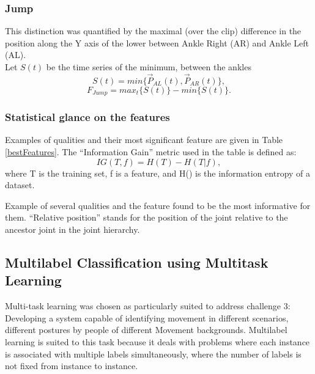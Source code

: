 \documentclass[11pt,twocolumn,varwidth=true,a4paper,fleqn]{sigchi}
\begin{document}
\subsubsection{Jump}
This distinction was quantified by the maximal (over the clip) difference in the position along the Y axis of the lower between Ankle Right (AR) and Ankle Left (AL). 
\\Let $S(t)$ be the time series of the minimum, between the ankles
\begin{equation*}
S(t) = min\{\vec{P}_{AL}(t), \vec{P}_{AR}(t)\},
\end{equation*}
\begin{equation*}
F_{Jump} = max_{t}\{S(t)\} - min\{S(t)\}.
\end{equation*}

\subsubsection{Statistical glance on the features}
Examples of qualities and their most significant feature are given in 
Table \ref{bestFeatures}. The ``Information Gain'' metric used
in the table is defined as:
\begin{equation*}
       IG(T,f) = H(T) - H(T|f),
\end{equation*}
where T is the training set, f is a feature, and H() is the information
entropy of a dataset.
\begin{table}
   \centering
   \caption{Example of several qualities and the feature found to be
   the most informative for them. ``Relative position'' stands for the
   position of the joint relative to the ancestor joint in the joint
   hierarchy.}
   \label{bestFeatures}
\end{table}

\subsection{Multilabel Classification using Multitask Learning}
 

Multi-task learning was chosen as particularly suited to address challenge 3:  Developing a system capable of identifying movement in different scenarios, different postures by people of different Movement backgrounds. Multilabel learning is suited to this task because it deals with problems where each instance is associated with multiple labels simultaneously, where the number of labels is not fixed from instance to instance. 
\end{document}

